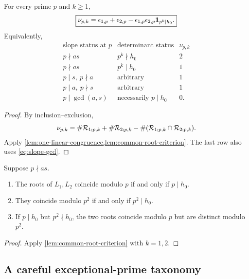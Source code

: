 \begin{theorem}
\label{thm:prime-power-root-count}
For every prime \(p\) and \(k\ge1\),
\begin{equation}
 \boxed{
 \nu_{p,k}
 =
 \epsilon_{1,p}+\epsilon_{2,p}
 -\epsilon_{1,p}\epsilon_{2,p}\mathbf 1_{p^k\mid h_0}.}
\label{eq:exact-root-count}
\end{equation}
Equivalently,
\[
\begin{array}{c|c|c}
\text{slope status at }p
&
\text{determinant status}
&
\nu_{p,k}
\\
\hline
p\nmid as
&
p^k\nmid h_0
&
2
\\
p\nmid as
&
p^k\mid h_0
&
1
\\
p\mid s,\ p\nmid a
&
\text{arbitrary}
&
1
\\
p\mid a,\ p\nmid s
&
\text{arbitrary}
&
1
\\
p\mid\gcd(a,s)
&
\text{necessarily }p\mid h_0
&
0.
\end{array}
\]
\end{theorem}

\begin{proof}
By inclusion--exclusion,
\[
 \nu_{p,k}
 =
 \#\mathcal R_{1;p,k}+\#\mathcal R_{2;p,k}
 -\#(\mathcal R_{1;p,k}\cap\mathcal R_{2;p,k}).
\]
Apply \cref{lem:one-linear-congruence,lem:common-root-criterion}.
The last row also uses \eqref{eq:slope-gcd}.
\end{proof}

\begin{corollary}
\label{cor:p-versus-p2}
Suppose \(p\nmid as\).
\begin{enumerate}[label=(\roman*),leftmargin=2.2em]
\item The roots of \(L_1,L_2\) coincide modulo \(p\) if and only if
\(p\mid h_0\).
\item They coincide modulo \(p^2\) if and only if \(p^2\mid h_0\).
\item If \(p\mid h_0\) but \(p^2\nmid h_0\), the two roots coincide
modulo \(p\) but are distinct modulo \(p^2\).
\end{enumerate}
\end{corollary}

\begin{proof}
Apply \cref{lem:common-root-criterion} with \(k=1,2\).
\end{proof}

\subsection{A careful exceptional-prime taxonomy}

